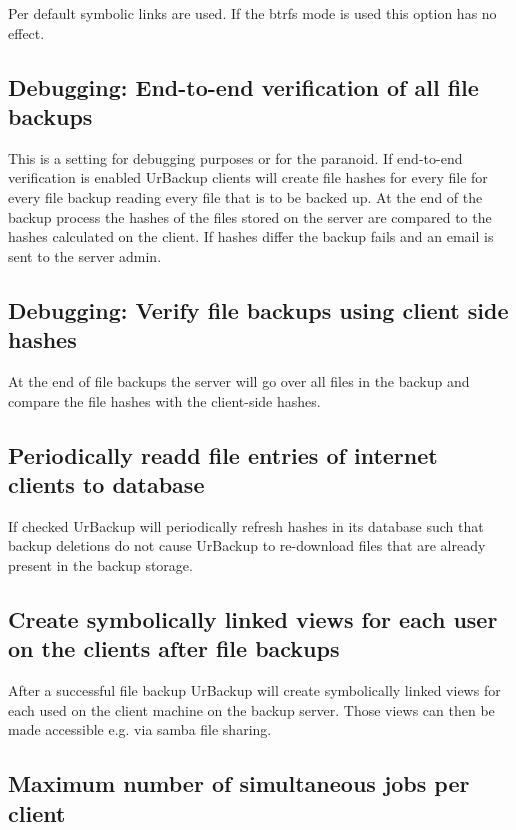 \documentclass[a4paper,10pt]{article}
\begin{document}
Per default symbolic links are used. If the btrfs mode is used this option has no effect.

\subsection{Debugging: End-to-end verification of all file backups}

This is a setting for debugging purposes or for the paranoid. If end-to-end verification is enabled UrBackup clients
will create file hashes for every file for every file backup reading every file that is to be backed up. At the end
of the backup process the hashes of the files stored on the server are compared to the hashes calculated on the client.
If hashes differ the backup fails and an email is sent to the server admin.

\subsection{Debugging: Verify file backups using client side hashes}

At the end of file backups the server will go over all files in the backup and compare the file hashes with the
client-side hashes.

\subsection{Periodically readd file entries of internet clients to database}

If checked UrBackup will periodically refresh hashes in its database such that backup deletions do not cause UrBackup to re-download files that are already present in the backup storage.

\subsection{Create symbolically linked views for each user on the clients after file backups}

After a successful file backup UrBackup will create symbolically linked views for each used on the client machine on the backup server.
Those views can then be made accessible e.g. via samba file sharing.

\subsection{Maximum number of simultaneous jobs per client}
\end{document}
